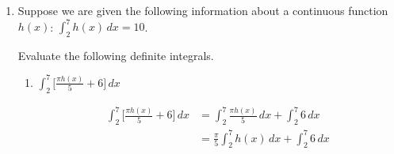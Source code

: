 \documentclass{article}
\begin{document}
\begin{enumerate}
\begin{enumerate}
    \begin{solution}
        The number of people at the market was greatest at approximately 5.5 hours after opening. This is because the rate of change of the number of people in the market is $r(t)-s(t)$. Before $t\approx 5.5$, this rate is positive, so the number of people in the market is increasing. After $t\approx 5.5$, this rate is negative, so the number of people in the market is decreasing. 
    \end{solution}

    \item 
    \begin{problem}
    Write an expression for the number of people in the market at the time indicated in part (b).
    \end{problem}
    \pspace{\vfill}

    \begin{solution}
    The number of people in the market at time $t=0$ is $200$, and the rate of change of the number of people in the market is $r(t)-s(t)$, so the total number of people at $t=5.5$ is
        $\displaystyle 200+\int_0^{5.5} \big[r(t)-s(t)\big]dt$.
    \end{solution}


    
\end{enumerate}

\pspace{\newpage}

\item
\begin{problem}
Suppose we are given the following information about a continuous function $h(x)$: $\displaystyle\int_{2}^{7} h(x) \,dx =10$. 

Evaluate the following definite integrals. 
\end{problem}

\begin{enumerate}
    \item 
    \begin{problem}
    $\displaystyle\int_{2}^{7} \Big[\frac{\pi h(x)}{5} +6\Big] \,dx$
    \end{problem}
    \pspace{\vfill}

    \begin{solution}
        \begin{align*}
            \displaystyle\int_{2}^{7} \Big[\frac{\pi h(x)}{5} +6\Big] \,dx &= \displaystyle\int_{2}^{7} \frac{\pi h(x)}{5} \,dx + \displaystyle\int_{2}^{7} 6 \, dx \\
            &= \frac{\pi}{5}\displaystyle\int_{2}^{7} h(x) \,dx + \displaystyle\int_{2}^{7} 6 \, dx
        \end{align*}


\end{solution}
\end{enumerate}
\end{enumerate}
\end{document}

